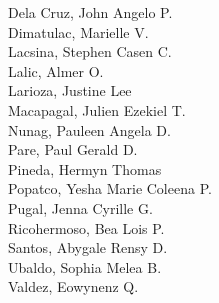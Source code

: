 Dela Cruz, John Angelo P. \\
Dimatulac, Marielle V. \\
Lacsina, Stephen Casen C. \\
Lalic, Almer O. \\
Larioza, Justine Lee \\
Macapagal, Julien Ezekiel T. \\
Nunag, Pauleen Angela D. \\
Pare, Paul Gerald D. \\
Pineda, Hermyn Thomas \\
Popatco, Yesha Marie Coleena P. \\
Pugal, Jenna Cyrille G. \\
Ricohermoso, Bea Lois P. \\
Santos, Abygale Rensy D. \\
Ubaldo, Sophia Melea B. \\
Valdez, Eowynenz Q.
